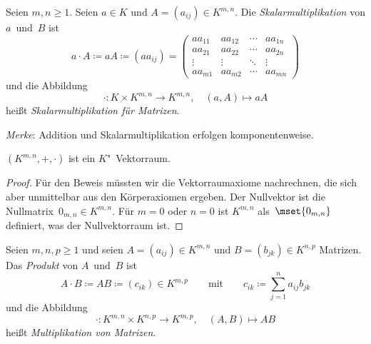 \documentclass[a4paper]{article}
\begin{document}
\begin{definition}[Skalarmultiplikation]
    Seien $m,n \geq 1$. Seien $a \in K$ und $A = (a_{ij}) \in K^{m,n}$. Die \emph{Skalarmultiplikation} von $a$~und~$B$ ist
    \begin{equation*}
        a\cdot A \coloneqq aA \coloneqq (aa_{ij}) =
        \begin{pmatrix}
            aa_{11} & aa_{12} & \cdots & aa_{1n} \\
            aa_{21} & aa_{22} & \cdots & aa_{2n} \\
            \vdots & \vdots & \ddots & \vdots \\
            aa_{m1} & aa_{m2} & \cdots & aa_{mn}
        \end{pmatrix}
    \end{equation*}
    und die Abbildung
    \begin{equation*}
        \cdot\colon K \times K^{m,n} \to K^{m,n},\quad (a,A) \mapsto aA
    \end{equation*}
    heißt \emph{Skalarmultiplikation für Matrizen}.
\end{definition}

\emph{Merke}: Addition und Skalarmultiplikation erfolgen komponentenweise.

\begin{lemma}
    $(K^{m,n},+,\cdot)$ ist ein $K$"~Vektorraum.
\end{lemma}

\begin{proof}
    Für den Beweis müssten wir die Vektorraumaxiome nachrechnen, die sich aber unmittelbar aus den Körperaxiomen ergeben. Der Nullvektor ist die Nullmatrix~$0_{m,n} \in K^{m,n}$. Für $m = 0$ oder $n = 0$ ist $K^{m,n}$ als~$\mset{0_{m,n}}$ definiert, was der Nullvektorraum ist. 
\end{proof}

\begin{definition}[Produkt]
    Seien $m,n,p \geq 1$ und seien $A = (a_{ij}) \in K^{m,n}$ und $B = (b_{jk}) \in K^{n,p}$ Matrizen. Das \emph{Produkt} von $A$~und~$B$ ist
    \begin{equation*}
        A\cdot B \coloneqq AB \coloneqq (c_{ik}) \in K^{m,p} \qquad\text{mit}\qquad c_{ik} \coloneqq \sum_{j=1}^n a_{ij}b_{jk}
    \end{equation*}
    und die Abbildung
    \begin{equation*}
        \cdot\colon K^{m,n} \times K^{n,p} \to K^{m,p},\quad (A,B) \mapsto AB
    \end{equation*}
    heißt \emph{Multiplikation von Matrizen}.
\end{definition}
\end{document}
